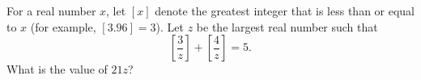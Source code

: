 For a real number $x$, let $[x]$ denote the greatest integer that is less than or equal to $x$ (for example, $[3.96]=3$). Let $z$ be the largest real number such that
\[\left[\dfrac3z\right]+\left[\dfrac4z\right]=5.\]
What is the value of $21z$?
